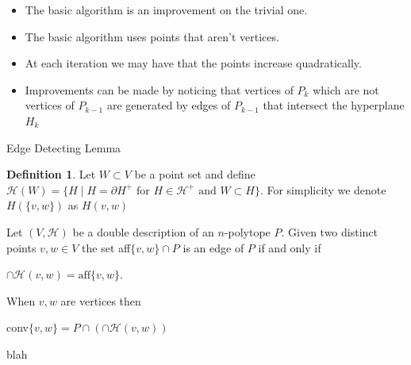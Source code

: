 \documentclass[9pt]{beamer}
\newcommand\set[1]{\{#1\}}
\theoremstyle{definition}
\newtheorem{defn}{Definition}
\begin{document}
\begin{frame}[fragile]{}
  \begin{itemize}
  \item The basic algorithm is an improvement on the trivial one.
  \item The basic algorithm uses points that aren't vertices.
  \item At each iteration we may have that the points increase quadratically.
  \item Improvements can be made by noticing that vertices of $P_k$ which are not vertices of $P_{k-1}$ are generated by edges of $P_{k-1}$ that intersect the hyperplane $H_k$
  \end{itemize}
\end{frame}


\begin{frame}[fragile]{Edge Detecting Lemma }
  \begin{defn}
    Let $W \subset V$ be a point set and define $\mathcal{H}(W) = \set{H \mid H = \partial H^+ \text{ for } H \in \mathcal{H^+} \text{ and } W \subset H}$. For simplicity we denote $H(\set{v, w})$ as $H(v, w)$
  \end{defn}
  \begin{lemma}
    Let $(V, \mathcal{H})$ be a double description of an $n$-polytope $P$. Given two distinct points $v, w \in V$ the set aff$\set{v, w} \cap P$ is an edge of $P$ if and only if
    \begin{center}
      $\cap \mathcal{H}(v, w) = \text{aff}\set{v, w}$.
    \end{center}

    
    When $v, w$ are vertices then
    \begin{center}
      conv$\set{v, w} = P \cap (\cap \mathcal{H}(v, w))$
    \end{center}
  \end{lemma}
\end{frame}


\begin{frame}[fragile]{}
  blah
\end{frame}
\end{document}
